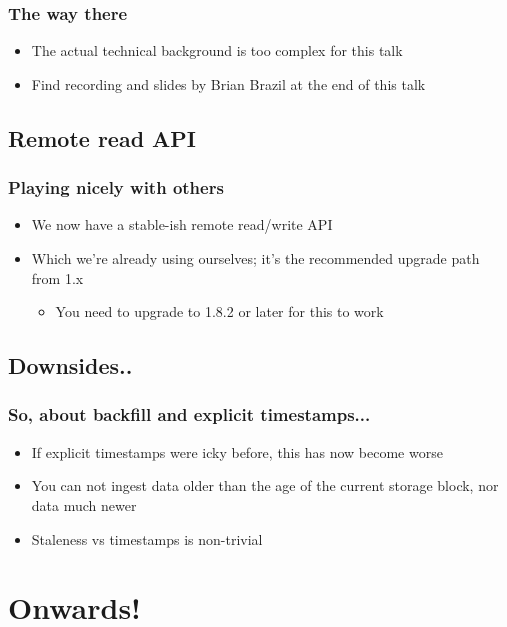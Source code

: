 \documentclass[t]{beamer}
\begin{document}
\begin{frame}
	\frametitle{The way there}
	\begin{itemize}
		\item The actual technical background is too complex for this talk
		\item Find recording and slides by Brian Brazil at the end of this talk
	\end{itemize}
\end{frame}


\subsection{Remote read API}

\begin{frame}
	\frametitle{Playing nicely with others}
	\begin{itemize}
		\item We now have a stable-ish remote read/write API
		\item Which we're already using ourselves; it's the recommended upgrade path from 1.x
		\begin{itemize}
			\item You need to upgrade to 1.8.2 or later for this to work
		\end{itemize}
	\end{itemize}
\end{frame}


\subsection{Downsides..}

\begin{frame}
	\frametitle{So, about backfill and explicit timestamps...}
	\begin{itemize}
		\item If explicit timestamps were icky before, this has now become worse
		\item You can not ingest data older than the age of the current storage block, nor data much newer
		\item Staleness vs timestamps is non-trivial
	\end{itemize}
\end{frame}



\section{Onwards!}
\end{document}
